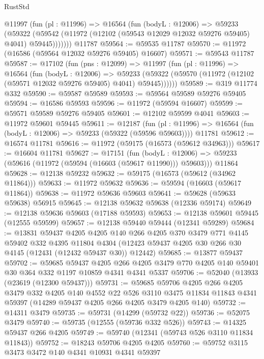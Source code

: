 \begin{lexlean}{RustStd}
\begin{coremodule}
      @11997
        (fun (pl : @11996) =>
        @16564
          (fun (bodyL : @12006) =>
          @59233
            (@59322
              (@59542 (@11972 (@12102 (@59543 @12029 @12032 @59276 @59405) @4041) @59445)))))))
    @11787
@59564 := @59535 @11787
@59570 := @11972 (@16586 (@59564 @12032 @59276 @59405) @16607)
@59571 := @59543 @11787
@59587 := @17102
    (fun (pns : @12099) =>
    @11997
      (fun (pl : @11996) =>
      @16564
        (fun (bodyL : @12006) =>
        @59233 (@59322 (@59570 (@11972 (@12102 (@59571 @12032 @59276 @59405) @4041) @59445))))))
@59589 := @319 @11774 @332
@59590 := @59587 @59589
@59593 := @59564 @59589 @59276 @59405
@59594 := @16586 @59593
@59596 := @11972 (@59594 @16607)
@59599 := @59571 @59589 @59276 @59405
@59601 := @12102 @59599 @4041
@59603 := @11972 @59601 @59445
@59611 := @12187
    (fun (pl : @11996) => @16564 (fun (bodyL : @12006) => @59233 (@59322 (@59596 @59603))))
    @11781
@59612 := @16574 @11781
@59616 := @11972 (@59175 (@16573 (@59612 @34963)))
@59617 := @16604 @11781
@59627 := @17151
    (fun (bodyL : @12006) => @59233 (@59616 (@11972 (@59594 (@16603 (@59617 @11990))) @59603)))
    @11864
@59628 := @12138 @59232
@59632 := @59175 (@16573 (@59612 (@34962 @11864)))
@59633 := @11972 @59632
@59636 := @59594 (@16603 (@59617 @11864))
@59638 := @11972 @59636 @59603
@59641 := @59628 (@59633 @59638) @56915
@59645 := @12138 @59632 @59638 (@12336 @59174)
@59649 := @12138 @59636 @59603 (@17188 @59593)
@59653 := @12138 @59601 @59445 (@12555 @59599)
@59657 := @12138 @59440 @59444 (@12341 @59289)
@59684 := @13831
    @59437
    @4205
    @4205
    @140
    @266
    @4205
    @370
    @3479
    @771
    @4145
    @59402
    @332
    @4395
    @11804
    @4304
    (@12423 @59437 @4205 @30 @266 @30 @4145 (@12431 (@12432 @59437 @30)) @12442)
@59685 := @13877 @59437
@59702 := @59685
    @59437
    @4205
    @266
    @4205
    @3479
    @770
    @4205
    @140
    @59401
    @30
    @364
    @332
    @1197
    @10859
    @4341
    @4341
    @5337
@59706 := @52040 (@13933 (@23619 (@12300 @59437)))
@59731 := @59685
    @59706
    @4205
    @266
    @4205
    @3479
    @332
    @4205
    @140
    @4552
    @22
    @526
    @3110
    @3475
    @11834
    @11843
    @4341
    @59397
    (@14289 @59437 @4205 @266 @4205 @3479 @4205 @140)
@59732 := @14311 @3479
@59735 := @59731 (@14299 (@59732 @22))
@59736 := @52075 @3479
@59740 := @59735 (@12555 (@59736 @332 @526))
@59743 := @14325 @59437 @266 @4205
@59749 := @59740 (@12341 (@59743 @526 @3110 @11834 @11843))
@59752 := @18243 @59706 @4205 @4205
@59760 := @59752 @3115 @3473 @3472 @140 @4341 @10931 @4341 @59397

\end{coremodule}
\end{lexlean}
